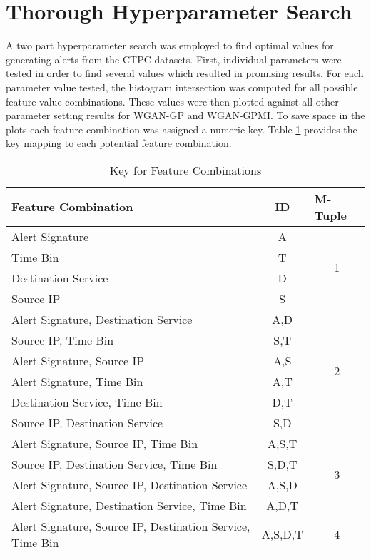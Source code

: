 \section{Thorough Hyperparameter Search}
\label{sec:search}
A two part hyperparameter search was employed to find optimal values for generating alerts from the CTPC datasets. First, individual parameters were tested in order to find several values which resulted in promising results. For each parameter value tested, the histogram intersection was computed for all possible feature-value combinations. These values were then plotted against all other parameter setting results for WGAN-GP and WGAN-GPMI. To save space in the plots each feature combination was assigned a numeric key. Table \ref{tab:key} provides the key mapping to each potential feature combination.

\begin{table}[!htbp]
	\caption{Key for Feature Combinations}
	\label{tab:key}
	\centering
	\begin{tabular}{l|c|c}
		\textbf{Feature Combination} & \textbf{ID} & \multicolumn{1}{l}{\textbf{M-Tuple}} \\ \hline
		Alert Signature & A & \multirow{4}{*}{1} \\
		Time Bin & T &  \\
		Destination Service & D &  \\
		Source IP & S &  \\ \hline
		Alert Signature, Destination Service & A,D & \multirow{6}{*}{2} \\
		Source IP, Time Bin & S,T &  \\
		Alert Signature, Source IP & A,S &  \\
		Alert Signature, Time Bin & A,T &  \\
		Destination Service, Time Bin & D,T &  \\
		Source IP, Destination Service & S,D &  \\ \hline
		Alert Signature, Source IP, Time Bin & A,S,T & \multirow{4}{*}{3} \\
		Source IP, Destination Service, Time Bin & S,D,T &  \\
		Alert Signature, Source IP, Destination Service & A,S,D &  \\
		Alert Signature, Destination Service, Time Bin & A,D,T &  \\ \hline
		Alert Signature, Source IP, Destination Service, Time Bin & A,S,D,T & 4
	\end{tabular}
\end{table}

